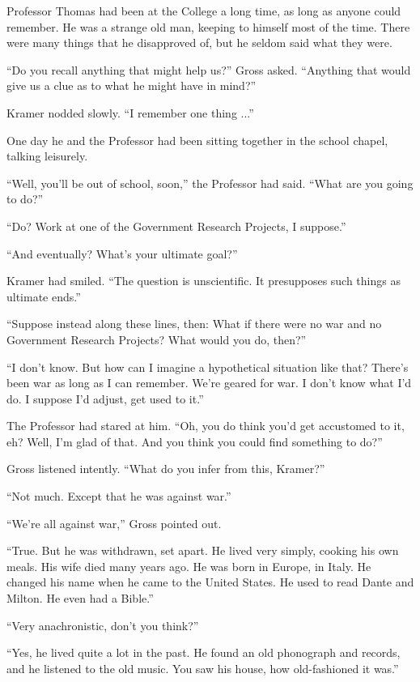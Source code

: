 \documentclass[12pt,a5paper]{book}
\begin{document}
Professor Thomas had been at the College a long time, as long as anyone could remember. He was a strange old man, keeping to himself most of the time. There were many things that he disapproved of, but he seldom said what they were.

“Do you recall anything that might help us?” Gross asked. “Anything that would give us a clue as to what he might have in mind?”

Kramer nodded slowly. “I remember one thing ...”

One day he and the Professor had been sitting together in the school chapel, talking leisurely.

“Well, you'll be out of school, soon,” the Professor had said. “What are you going to do?”

“Do? Work at one of the Government Research Projects, I suppose.”

“And eventually? What's your ultimate goal?”

Kramer had smiled. “The question is unscientific. It presupposes such things as ultimate ends.”

“Suppose instead along these lines, then: What if there were no war and no Government Research Projects? What would you do, then?”

“I don't know. But how can I imagine a hypothetical situation like that? There's been war as long as I can remember. We're geared for war. I don't know what I'd do. I suppose I'd adjust, get used to it.”

The Professor had stared at him. “Oh, you do think you'd get accustomed to it, eh? Well, I'm glad of that. And you think you could find something to do?”

Gross listened intently. “What do you infer from this, Kramer?”

“Not much. Except that he was against war.”

“We're all against war,” Gross pointed out.

“True. But he was withdrawn, set apart. He lived very simply, cooking his own meals. His wife died many years ago. He was born in Europe, in Italy. He changed his name when he came to the United States. He used to read Dante and Milton. He even had a Bible.”

“Very anachronistic, don't you think?”

“Yes, he lived quite a lot in the past. He found an old phonograph and records, and he listened to the old music. You saw his house, how old-fashioned it was.”
\end{document}

